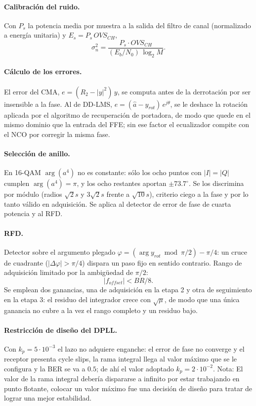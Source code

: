 \paragraph{Calibración del ruido.}
Con $P_s$ la potencia media por muestra a la salida del filtro de canal
(normalizado a energía unitaria) y $E_s = P_s\,OVS_{CH}$,
%
\begin{equation}
\sigma_n^{2} = \frac{P_s \cdot OVS_{CH}}{(E_b/N_0)\,\log_2 M}.
\label{eq:ej1_ruido}
\end{equation}
\paragraph{Cálculo de los errores.}
El error del CMA, $e = (R_2 - |y|^2)\,y$, se computa antes de la derrotación
por ser insensible a la fase. Al de DD-LMS, $e = (\hat{a} - y_{rot})\,e^{j\theta}$,
se le deshace la rotación aplicada por el algoritmo de recuperación de
portadora, de modo que quede en el mismo dominio que la entrada del FFE; sin
ese factor el ecualizador compite con el NCO por corregir la misma fase.
\paragraph{Selección de anillo.}
En 16-QAM $\arg(a^4)$ no es constante: sólo los ocho puntos con $|I|=|Q|$
cumplen $\arg(a^4)=\pi$, y los ocho restantes aportan $\pm73.7^\circ$. Se los
discrimina por módulo (radios $\sqrt{2}s$ y $3\sqrt{2}s$ frente a
$\sqrt{10}s$), criterio ciego a la fase y por lo tanto válido en adquisición.
Se aplica al detector de error de fase de cuarta potencia y al RFD.
\paragraph{RFD.}
Detector sobre el argumento plegado
$\varphi = (\arg y_{rot} \bmod \pi/2) - \pi/4$: un cruce de cuadrante
(\mbox{$|\Delta\varphi| > \pi/4$}) dispara un paso fijo en sentido contrario.
Rango de adquisición limitado por la ambigüedad de $\pi/2$:
%
\begin{equation}
|f_{offset}| < BR/8.
\end{equation}
%
Se emplean dos ganancias, una de adquisición en la etapa 2 y otra de
seguimiento en la etapa 3: el residuo del integrador crece con $\sqrt{\mu}$,
de modo que una única ganancia no cubre a la vez el rango completo y un
residuo bajo.
\paragraph{Restricción de diseño del DPLL.}
Con $k_p = 5\cdot10^{-3}$ el lazo no adquiere enganche: el error de fase no
converge y el receptor presenta cycle slips, la
rama integral llega al valor máximo que se le configura y la BER se va a $0.5$; de ahí el valor adoptado
$k_p = 2\cdot10^{-2}$.
Nota: El valor de la rama integral debería dispararse a infinito por estar trabajando en punto flotante, colocar un valor máximo fue una decisión de diseño para tratar de lograr una mejor estabilidad.
